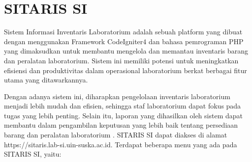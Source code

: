\section{SITARIS SI}
Sistem Informasi Inventaris Laboratorium adalah sebuah platform yang dibuat dengan menggunakan Framework CodeIgniter4 dan bahasa pemrograman PHP yang dimaksudkan untuk membantu mengelola dan memantau inventaris barang dan peralatan laboratorium. Sistem ini memiliki potensi untuk meningkatkan efisiensi dan produktivitas dalam operasional laboratorium berkat berbagai fitur utama yang ditawarkannya.

Dengan adanya sistem ini, diharapkan pengelolaan inventaris laboratorium menjadi lebih mudah dan efisien, sehingga staf laboratorium dapat fokus pada tugas yang lebih penting. Selain itu, laporan yang dihasilkan oleh sistem dapat membantu dalam pengambilan keputusan yang lebih baik tentang persediaan barang dan peralatan laboratorium \cite{sitaris-lab-si-website}. SITARIS SI dapat diakses di alamat https://sitaris.lab-si.uin-suska.ac.id. Terdapat beberapa menu yang ada pada SITARIS SI, yaitu:

